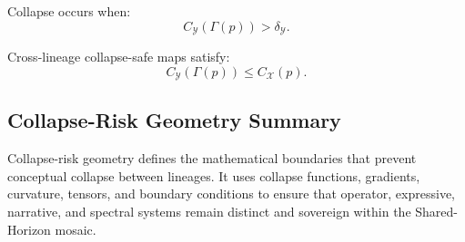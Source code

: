 Collapse occurs when:
\[
C_{\mathcal{Y}}(\Gamma(p)) > \delta_{\mathcal{Y}}.
\]

Cross-lineage collapse-safe maps satisfy:
\[
C_{\mathcal{Y}}(\Gamma(p)) \le C_{\mathcal{X}}(p).
\]

\subsection{Collapse-Risk Geometry Summary}

Collapse-risk geometry defines the mathematical boundaries that prevent
conceptual collapse between lineages. It uses collapse functions, gradients,
curvature, tensors, and boundary conditions to ensure that operator, expressive,
narrative, and spectral systems remain distinct and sovereign within the
Shared-Horizon mosaic.
